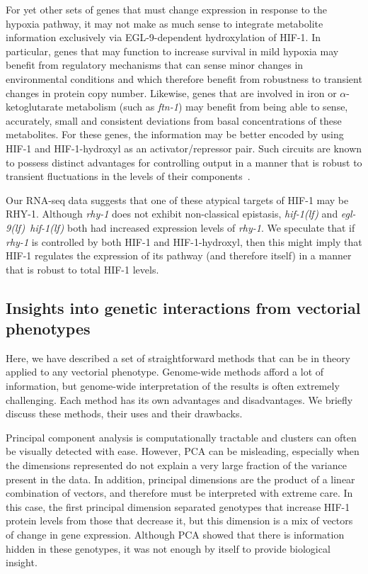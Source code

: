 \documentclass[10pt, onecolumn]{article}
\newcommand{\gene}[1]{\emph{#1}}
\newcommand{\ftna}{\emph{\mbox{ftn-1}}}
\newcommand{\eglhif}{\emph{\mbox{egl-9(lf)}~\mbox{hif-1(lf)}}}
\newcommand{\hif}{\emph{\mbox{hif-1(lf)}}}
\newcommand{\eglp}{EGL-9}
\newcommand{\rhyp}{RHY-1}
\newcommand{\hifp}{HIF-1}
\begin{document}
For yet other sets of genes that must change expression in response to the hypoxia
pathway, it may not make as much sense to integrate metabolite information
exclusively via \eglp{}-dependent hydroxylation of \hifp{}. In particular, genes
that may function to increase survival in mild hypoxia may benefit from regulatory
mechanisms that can sense minor changes in environmental conditions and which
therefore benefit from robustness to transient changes in protein copy number.
Likewise, genes that are involved in iron or $\alpha$-ketoglutarate metabolism
(such as \ftna{}) may benefit from being able to sense, accurately, small and
consistent deviations from basal concentrations of these metabolites. For these
genes, the information may be better encoded by using \hifp{} and
\hifp{}-hydroxyl as an activator/repressor pair. Such circuits are
known to possess distinct advantages for controlling output in a manner that
is robust to transient fluctuations in the levels of their
components~\cite{Hart2012,Hart2013}.

Our RNA-seq data suggests that one of these atypical targets of \hifp{}
may be \rhyp{}. Although \gene{rhy-1} does not exhibit non-classical
epistasis, \hif{} and \eglhif{} both had increased expression levels of \gene{rhy-1}.
We speculate that if \gene{rhy-1} is controlled by both \hifp{} and \hifp{}-hydroxyl,
then this might imply that \hifp{} regulates the expression of its pathway (and
therefore itself) in a manner that is robust to total \hifp{} levels.

\subsection*{Insights into genetic interactions from vectorial phenotypes}

Here, we have described a set of straightforward methods that can be in theory
applied to any vectorial phenotype. Genome-wide methods afford a lot of information,
but genome-wide interpretation of the results is often extremely challenging.
Each method has its own advantages and disadvantages. We briefly discuss these
methods, their uses and their drawbacks.

Principal component analysis
is computationally tractable and clusters can often be visually detected with
ease. However, PCA can be misleading, especially when the dimensions represented
do not explain a very large fraction of the variance present in the data. In addition,
principal dimensions are the product of a linear combination of vectors, and therefore
must be interpreted with extreme care. In this case, the first principal dimension
separated genotypes that increase \hifp{} protein levels from those that decrease
it, but this dimension is a mix of vectors of change in gene expression. Although
PCA showed that there is information hidden in these genotypes, it was not enough
by itself to provide biological insight.
\end{document}
